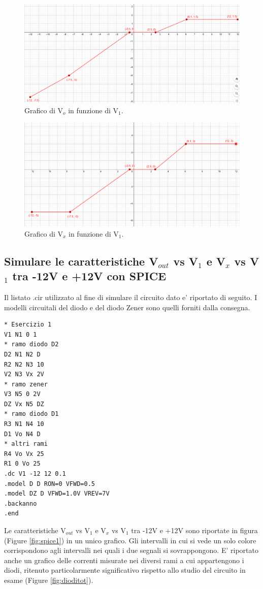 \documentclass[a4paper,10pt]{article}
\begin{document}
\begin{figure}[h!]
  	\centering
 	\includegraphics[width=0.9\linewidth]{es-1-1-6.png}
  	\caption{Grafico di V$_o$ in funzione di V$_1$.}
  	\label{fig:graph1}
\end{figure}

\begin{figure}[h!]
  	\centering
 	\includegraphics[width=0.9\linewidth]{es-1-1-7.png}
  	\caption{Grafico di V$_x$ in funzione di V$_1$.}
  	\label{fig:graph2}
\end{figure}

\pagebreak
\subsection{Simulare le caratteristiche V$_{out}$ vs V$_1$ e V$_x$ vs V$_1$ tra -12V e +12V con SPICE}
Il listato .cir utilizzato al fine di simulare il circuito dato e' riportato di seguito. I modelli circuitali del diodo e del diodo Zener sono quelli forniti dalla consegna. 
\begin{verbatim}
* Esercizio 1
V1 N1 0 1
* ramo diodo D2
D2 N1 N2 D
R2 N2 N3 10
V2 N3 Vx 2V
* ramo zener
V3 N5 0 2V
DZ Vx N5 DZ
* ramo diodo D1
R3 N1 N4 10
D1 Vo N4 D
* altri rami
R4 Vo Vx 25
R1 0 Vo 25
.dc V1 -12 12 0.1
.model D D RON=0 VFWD=0.5
.model DZ D VFWD=1.0V VREV=7V
.backanno
.end
\end{verbatim}

Le caratteristiche V$_{out}$ vs V$_1$ e V$_x$ vs V$_1$ tra -12V e +12V sono riportate in figura (Figure \ref{fig:spice1}) in un unico grafico. Gli intervalli in cui si vede un solo colore corrispondono agli intervalli nei quali i due segnali si sovrappongono. E' riportato anche un grafico delle correnti misurate nei diversi rami a cui appartengono i diodi, ritenuto particolarmente significativo rispetto allo studio del circuito in esame (Figure \ref{fig:dioditot}).
\end{document}
